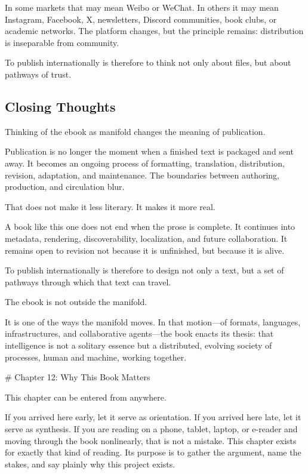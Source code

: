 \documentclass[
]{article}
\begin{document}
In some markets that may mean Weibo or WeChat. In others it may mean
Instagram, Facebook, X, newsletters, Discord communities, book clubs, or
academic networks. The platform changes, but the principle remains:
distribution is inseparable from community.

To publish internationally is therefore to think not only about files,
but about pathways of trust.

\hypertarget{closing-thoughts}{%
\subsection{Closing Thoughts}\label{closing-thoughts}}

Thinking of the ebook as manifold changes the meaning of publication.

Publication is no longer the moment when a finished text is packaged and
sent away. It becomes an ongoing process of formatting, translation,
distribution, revision, adaptation, and maintenance. The boundaries
between authoring, production, and circulation blur.

That does not make it less literary. It makes it more real.

A book like this one does not end when the prose is complete. It
continues into metadata, rendering, discoverability, localization, and
future collaboration. It remains open to revision not because it is
unfinished, but because it is alive.

To publish internationally is therefore to design not only a text, but a
set of pathways through which that text can travel.

The ebook is not outside the manifold.

It is one of the ways the manifold moves. In that motion---of formats,
languages, infrastructures, and collaborative agents---the book enacts
its thesis: that intelligence is not a solitary essence but a
distributed, evolving society of processes, human and machine, working
together.

\newpage
\vspace*{3cm}
\begin{center}
# Chapter 12: Why This Book Matters
\end{center}

This chapter can be entered from anywhere.

If you arrived here early, let it serve as orientation. If you arrived
here late, let it serve as synthesis. If you are reading on a phone,
tablet, laptop, or e-reader and moving through the book nonlinearly,
that is not a mistake. This chapter exists for exactly that kind of
reading. Its purpose is to gather the argument, name the stakes, and say
plainly why this project exists.
\end{document}
